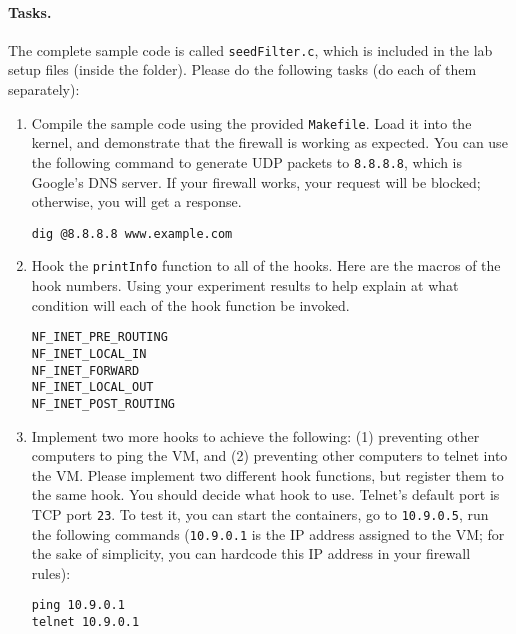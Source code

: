 \paragraph{Tasks.} The complete sample code is 
called \texttt{seedFilter.c}, which is included 
in the lab setup files (inside the 
folder). Please do the following tasks (do each of them
separately):

\begin{enumerate}
\item Compile the sample code using the provided \texttt{Makefile}. 
  Load it into the kernel, and demonstrate that the firewall is working as expected. You can use
    the following command to generate UDP packets to \texttt{8.8.8.8}, which is Google's DNS
    server. If your firewall works, your request will be blocked; otherwise, you will get a
    response.

\begin{lstlisting}
dig @8.8.8.8 www.example.com 
\end{lstlisting}
     

\item Hook the \texttt{printInfo} function to all of the 
\netfilter hooks. Here are the macros of the hook numbers. 
Using your experiment results to help explain at what condition
will each of the hook function be invoked. 

\begin{lstlisting}
NF_INET_PRE_ROUTING 
NF_INET_LOCAL_IN        
NF_INET_FORWARD 
NF_INET_LOCAL_OUT 
NF_INET_POST_ROUTING    
\end{lstlisting}


\item Implement two more hooks to achieve the following:
(1) preventing other computers to ping the VM, and
(2) preventing other computers to telnet into the VM. 
Please implement two different hook functions, but register them
to the same \netfilter hook. You should decide what hook to use.
Telnet's default port is TCP port \texttt{23}. To test it, you can
start the containers, go to \texttt{10.9.0.5}, run the 
following commands (\texttt{10.9.0.1} is the IP address assigned
to the VM; for the sake of simplicity, you can hardcode this IP
address in your firewall rules):
 
\begin{lstlisting}
ping 10.9.0.1
telnet 10.9.0.1
\end{lstlisting}
     
\end{enumerate}
 

